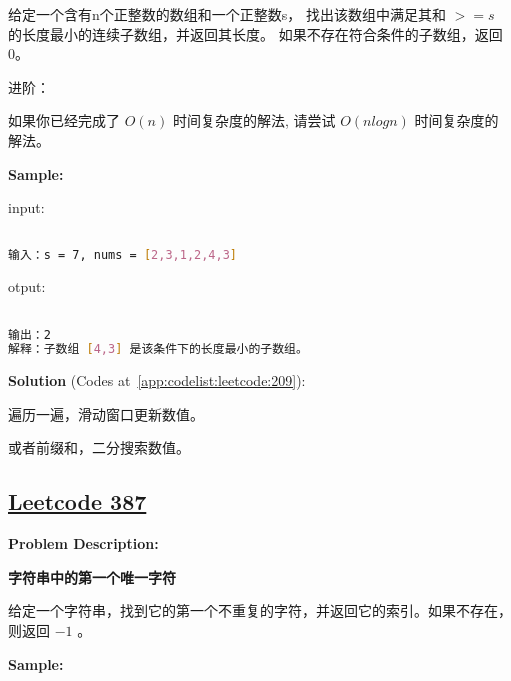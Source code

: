 给定一个含有n个正整数的数组和一个正整数s，
找出该数组中满足其和 $ >= s $ 的长度最小的连续子数组，并返回其长度。
如果不存在符合条件的子数组，返回 0。\par

进阶：\par

如果你已经完成了 $ O(n) $ 时间复杂度的解法, 请尝试 $ O(n log n) $ 时间复杂度的解法。\par


\textbf{Sample:}\par

input:\par

\begin{lstlisting}[language=bash]

输入：s = 7, nums = [2,3,1,2,4,3]


\end{lstlisting}

otput:\par

\begin{lstlisting}[language=bash]

输出：2
解释：子数组 [4,3] 是该条件下的长度最小的子数组。


\end{lstlisting}

\textbf{Solution }(Codes at~\ref{app:codelist:leetcode:209}):\par

遍历一遍，滑动窗口更新数值。\par

或者前缀和，二分搜索数值。\par



\subsection{\href{https://leetcode-cn.com/}{Leetcode 387}}\label{app:problemlist:leetcode:387}

\textbf{Problem Description:}\par

\textbf{字符串中的第一个唯一字符}\par

给定一个字符串，找到它的第一个不重复的字符，并返回它的索引。如果不存在，则返回 $ -1 $ 。\par


\textbf{Sample:}\par

